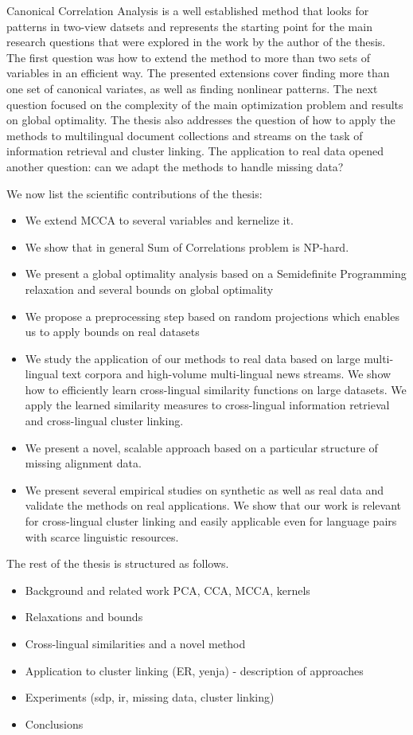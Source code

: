 Canonical Correlation Analysis is a well established method that looks for patterns in two-view datsets and represents
the starting point for the main research questions that were explored in the work by the author of the thesis. The
first question was how to extend the method to more than two sets of variables in an efficient way. The presented extensions
cover finding more than one set of canonical variates, as well as finding nonlinear patterns. The
next question focused on the complexity of the main optimization problem and results on global optimality. 
The thesis also addresses the question of how to apply the methods to multilingual document collections and streams
on the task of information retrieval and cluster linking. The application to real data opened another question: can
we adapt the methods to handle missing data?

We now list the scientific contributions of the thesis:
\begin{itemize}
\item We extend MCCA to several variables and kernelize it.
\item We show that in general Sum of Correlations problem is NP-hard.
\item We present a global optimality analysis based on a Semidefinite Programming relaxation and several bounds on global optimality
\item We propose a preprocessing step based on random projections which enables us to apply bounds on real datasets
\item We study the application of our methods to real data based on large multi-lingual text corpora and high-volume multi-lingual news streams. We show how to efficiently learn cross-lingual similarity functions on large datasets. We apply the learned similarity measures to cross-lingual information retrieval and
    cross-lingual cluster linking.
\item We present a novel, scalable approach based on a particular structure of missing alignment data.
\item We present several empirical studies on synthetic as well as real data and validate the methods on real applications. We show that our work is relevant for cross-lingual cluster linking and easily applicable even for language pairs with scarce linguistic resources.
\end{itemize}

The rest of the thesis is structured as follows.
\begin{itemize}
\item Background and related work PCA, CCA, MCCA, kernels
\item Relaxations and bounds
\item Cross-lingual similarities and a novel method
\item Application to cluster linking (ER, yenja) - description of approaches
\item Experiments (sdp, ir, missing data, cluster linking)
\item Conclusions
\end{itemize}


